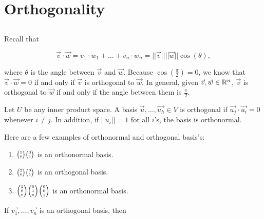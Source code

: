 \chapter{Orthogonality}

\section{}

  Recall that 

  \begin{equation}
    \vec{v}\cdot\vec{w}=v_1\cdot w_1+\ldots+v_n\cdot w_n = | | \vec{v} | | | | \vec{w} | | \cos(\theta)
  ,\end{equation}

  where $\theta$ is the angle between $\vec{v}$ and $\vec{w}$. Because $\cos\left(\frac{\pi}{2}\right)=0$, we know that $\vec{v}\cdot\vec{w}=0$ if and only if $\vec{v}$ is orthogonal to $\vec{w}$. In general, given $\vec{v},\vec{w}\in\mathbb{R}^n$, $\vec{v}$ is orthogonal to $\vec{w}$ if and only if the angle between them is $\frac{\pi}{2}$.

  \begin{definition}
    Let $U$ be any inner product space. A basis $\vec{u},\ldots,\vec{u_h}\in V$ is orthogonal if $\vec{u_j}\cdot \vec{u_i} = 0$ whenever $i\neq j$.\newline
    In addition, if $| |u_i| |=1$ for all $i$'s, the basis is orthonormal.
  \end{definition}
  
  Here are a few examples of orthonormal and orthogonal basis's:

  \begin{enumerate}
    \item $\SmallMatrix{1\\0}\SmallMatrix{0\\1}$ is an orthonormal basis.
    \item $\SmallMatrix{2\\0}\SmallMatrix{0\\1}$ is an orthogonal basis.
    \item $\SmallMatrix{1\\0\\0}\SmallMatrix{0\\1\\0}\SmallMatrix{0\\0\\1}$ is an orthonormal basis.
  \end{enumerate}

  If $\vec{v_1},\ldots,\vec{v_n}$ is an orthogonal basis, then 

